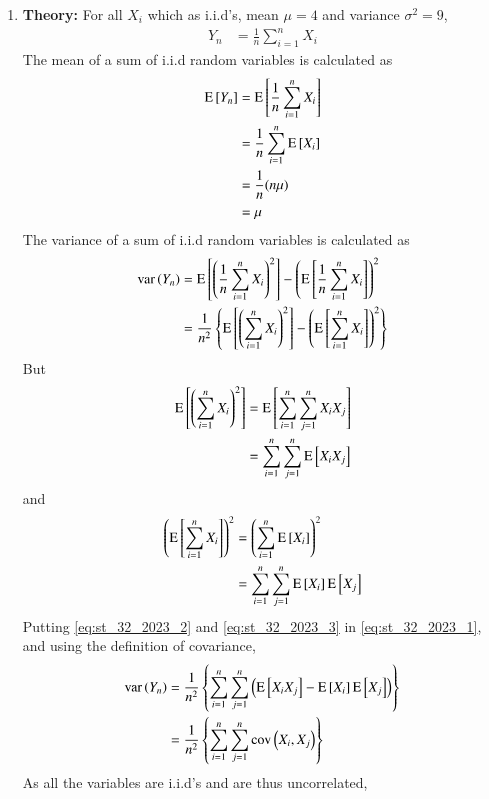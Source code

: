 \documentclass[journal,12pt,twocolumn]{IEEEtran}
\theoremstyle{remark}
\begin{document}
\begin{enumerate}
\item \textbf{Theory:}
For all $X_i$ which as i.i.d's, mean $\mu = 4$ and variance $\sigma^2 = 9$,
\begin{align}
    Y_n &= \frac{1}{n} \sum_{i=1}^{n} X_i
\end{align}
The mean of a sum of i.i.d random variables is calculated as
\begin{align}
    \text{E}{}\left[Y_n\right] &= \text{E}{}\left[\frac{1}{n} \sum_{i=1}^{n} X_i\right]\\
    &= \frac{1}{n} \sum_{i=1}^{n} \text{E}{}\left[X_i\right]\\
    &= \frac{1}{n} (n\mu)\\
    &= \mu
\end{align}
The variance of a sum of i.i.d random variables is calculated as
\begin{align}
    \text{var}\brak{Y_n} &= \text{E}\sbrak{\brak{\frac{1}{n} \sum_{i=1}^{n} X_i}^2} - \brak{\text{E}\sbrak{\frac{1}{n} \sum_{i=1}^{n} X_i}}^2\\
    &= \frac{1}{n^2} \cbrak{\text{E}\sbrak{\brak{\sum_{i=1}^{n} X_i}^2} - \brak{\text{E}\sbrak{\sum_{i=1}^{n} X_i}}^2}\label{eq:st_32_2023_1}
\end{align}
But
\begin{align}
    \text{E}\sbrak{\brak{\sum_{i=1}^{n} X_i}^2} &= \text{E}\sbrak{\sum_{i=1}^{n} \sum_{j=1}^{n} X_iX_j}\\
    &= \sum_{i=1}^{n} \sum_{j=1}^{n} \text{E}\sbrak{X_iX_j} \label{eq:st_32_2023_2}
\end{align}
and 
\begin{align}
    \brak{\text{E}\sbrak{\sum_{i=1}^{n} X_i}}^2 &= \brak{\sum_{i=1}^{n} \text{E}\sbrak{X_i}}^2\\
    &= \sum_{i=1}^{n} \sum_{j=1}^{n} \text{E}\sbrak{X_i} \text{E}\sbrak{X_j} \label{eq:st_32_2023_3}
\end{align}
Putting \eqref{eq:st_32_2023_2} and \eqref{eq:st_32_2023_3} in \eqref{eq:st_32_2023_1}, and using the definition of covariance,
\begin{align}
    \text{var}\brak{Y_n} &= \frac{1}{n^2} \cbrak{\sum_{i=1}^{n} \sum_{j=1}^{n} \brak{\text{E}\sbrak{X_iX_j} - \text{E}\sbrak{X_i} \text{E}\sbrak{X_j}}}\\
    &= \frac{1}{n^2} \cbrak{\sum_{i=1}^{n} \sum_{j=1}^{n} \text{cov}\brak{X_i, X_j}} \label{eq:st_32_2023_4}
\end{align}
As all the variables are i.i.d's and are thus uncorrelated,
\begin{align}

\end{align}
\end{enumerate}
\end{document}
